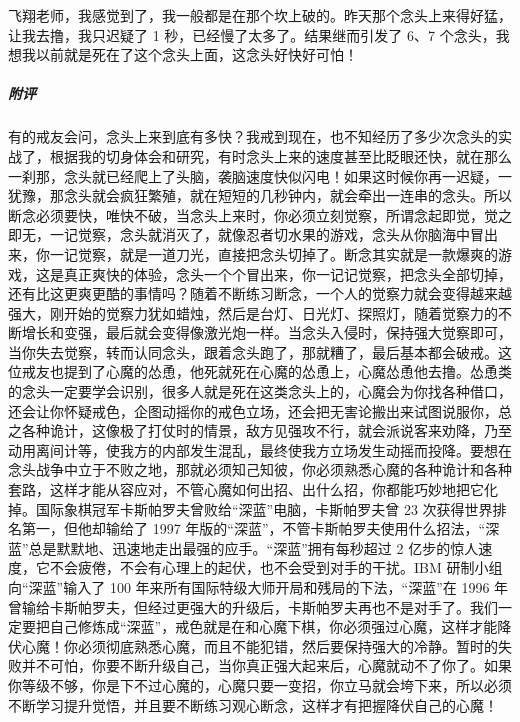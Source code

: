 \begin{case}
    飞翔老师，我感觉到了，我一般都是在那个坎上破的。昨天那个念头上来得好猛，让我去撸，我只迟疑了 1 秒，已经慢了太多了。结果继而引发了 6、7 个念头，我想我以前就是死在了这个念头上面，这念头好快好可怕！
    \subparagraph{附评} 有的戒友会问，念头上来到底有多快？我戒到现在，也不知经历了多少次念头的实战了，根据我的切身体会和研究，有时念头上来的速度甚至比眨眼还快，就在那么一刹那，念头就已经爬上了头脑，袭脑速度快似闪电！如果这时候你再一迟疑，一犹豫，那念头就会疯狂繁殖，就在短短的几秒钟内，就会牵出一连串的念头。所以断念必须要快，唯快不破，当念头上来时，你必须立刻觉察，所谓念起即觉，觉之即无，一记觉察，念头就消灭了，就像忍者切水果的游戏，念头从你脑海中冒出来，你一记觉察，就是一道刀光，直接把念头切掉了。断念其实就是一款爆爽的游戏，这是真正爽快的体验，念头一个个冒出来，你一记记觉察，把念头全部切掉，还有比这更爽更酷的事情吗？随着不断练习断念，一个人的觉察力就会变得越来越强大，刚开始的觉察力犹如蜡烛，然后是台灯、日光灯、探照灯，随着觉察力的不断增长和变强，最后就会变得像激光炮一样。当念头入侵时，保持强大觉察即可，当你失去觉察，转而认同念头，跟着念头跑了，那就糟了，最后基本都会破戒。这位戒友也提到了心魔的怂恿，他死就死在心魔的怂恿上，心魔怂恿他去撸。怂恿类的念头一定要学会识别，很多人就是死在这类念头上的，心魔会为你找各种借口，还会让你怀疑戒色，企图动摇你的戒色立场，还会把无害论搬出来试图说服你，总之各种诡计，这像极了打仗时的情景，敌方见强攻不行，就会派说客来劝降，乃至动用离间计等，使我方的内部发生混乱，最终使我方立场发生动摇而投降。要想在念头战争中立于不败之地，那就必须知己知彼，你必须熟悉心魔的各种诡计和各种套路，这样才能从容应对，不管心魔如何出招、出什么招，你都能巧妙地把它化掉。国际象棋冠军卡斯帕罗夫曾败给“深蓝”电脑，卡斯帕罗夫曾 23 次获得世界排名第一，但他却输给了 1997 年版的“深蓝”，不管卡斯帕罗夫使用什么招法，“深蓝”总是默默地、迅速地走出最强的应手。“深蓝”拥有每秒超过 2 亿步的惊人速度，它不会疲倦，不会有心理上的起伏，也不会受到对手的干扰。IBM 研制小组向“深蓝”输入了 100 年来所有国际特级大师开局和残局的下法，“深蓝”在 1996 年曾输给卡斯帕罗夫，但经过更强大的升级后，卡斯帕罗夫再也不是对手了。我们一定要把自己修炼成“深蓝”，戒色就是在和心魔下棋，你必须强过心魔，这样才能降伏心魔！你必须彻底熟悉心魔，而且不能犯错，然后要保持强大的冷静。暂时的失败并不可怕，你要不断升级自己，当你真正强大起来后，心魔就动不了你了。如果你等级不够，你是下不过心魔的，心魔只要一变招，你立马就会垮下来，所以必须不断学习提升觉悟，并且要不断练习观心断念，这样才有把握降伏自己的心魔！
\end{case}

